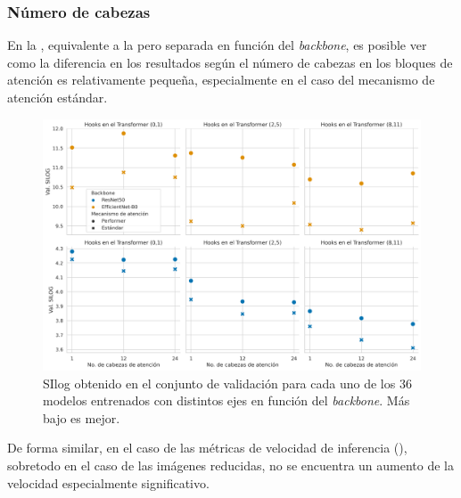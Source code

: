 \subsubsection{Número de cabezas}\label{resultados-cuantitativos-cabezas}

En la , equivalente a la  pero separada en función del \textit{backbone}, es posible ver como la diferencia en los resultados según el número de cabezas en los bloques de atención es relativamente pequeña, especialmente en el caso del mecanismo de atención estándar.

\begin{figure}[H]
\centering
\includegraphics[width=\linewidth]{imagenes/Resultados/SIlog_val_split.png} 
\captionsetup{width=.95\linewidth}
\caption{SIlog obtenido en el conjunto de validación para cada uno de los 36 modelos entrenados con distintos ejes en función del \textit{backbone}. Más bajo es mejor.}
\label{fig:SIlog-val-split}
\end{figure}

De forma similar, en el caso de las métricas de velocidad de inferencia (), sobretodo en el caso de las imágenes reducidas, no se encuentra un aumento de la velocidad especialmente significativo.

